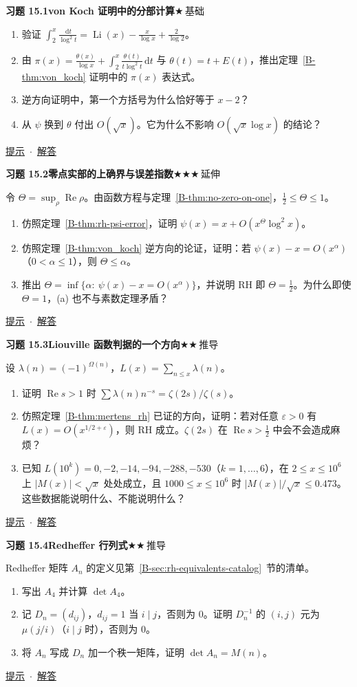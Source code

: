 \documentclass[11pt,a4paper]{article}
\DeclareMathOperator{\Li}{Li}
\newcommand{\dd}{\,\mathrm{d}}
\renewcommand{\Re}{\operatorname{Re}}
\newcommand{\bref}[1]{\ref*{B-#1}}
\newcommand{\lvI}{$\bigstar$\,基础}
\newcommand{\lvII}{$\bigstar\bigstar$\,推导}
\newcommand{\lvIII}{$\bigstar\bigstar\bigstar$\,延伸}
\newcommand{\Q}[3]{%
  \par\addvspace{1.1em}\noindent
  \hypertarget{q:#1}{}\textbf{习题 #1}\quad\textbf{#3}\hfill{\small #2}\par
  \nopagebreak\smallskip}
\newcommand{\toHint}[1]{\hfill{\small\hyperlink{h:#1}{提示}\ $\cdot$\ \hyperlink{s:#1}{解答}}}
\begin{document}
\Q{15.1}{\lvI}{von Koch 证明中的分部计算}
\begin{enumerate}
  \item 验证 $\int_2^x\frac{\dd t}{\log^2t}=\Li(x)-\frac x{\log x}+\frac2{\log2}$。
  \item 由 $\pi(x)=\frac{\theta(x)}{\log x}+\int_2^x\frac{\theta(t)}{t\log^2t}\dd t$ 与 $\theta(t)=t+E(t)$，推出定理~\bref{thm:von_koch} 证明中的 $\pi(x)$ 表达式。
  \item 逆方向证明中，第一个方括号为什么恰好等于 $x-2$？
  \item 从 $\psi$ 换到 $\theta$ 付出 $O(\sqrt x)$。它为什么不影响 $O(\sqrt x\log x)$ 的结论？
\end{enumerate}
\toHint{15.1}

\Q{15.2}{\lvIII}{零点实部的上确界与误差指数}
令 $\Theta=\sup_\rho\Re\rho$。由函数方程与定理~\bref{thm:no-zero-on-one}，$\frac12\le\Theta\le1$。
\begin{enumerate}
  \item 仿照定理~\bref{thm:rh-psi-error}，证明 $\psi(x)=x+O(x^\Theta\log^2x)$。
  \item 仿照定理~\bref{thm:von_koch} 逆方向的论证，证明：若 $\psi(x)-x=O(x^\alpha)$（$0<\alpha\le1$），则 $\Theta\le\alpha$。
  \item 推出 $\Theta=\inf\{\alpha:\ \psi(x)-x=O(x^\alpha)\}$，并说明 RH 即 $\Theta=\frac12$。为什么即使 $\Theta=1$，(a) 也不与素数定理矛盾？
\end{enumerate}
\toHint{15.2}

\Q{15.3}{\lvII}{Liouville 函数判据的一个方向}
设 $\lambda(n)=(-1)^{\Omega(n)}$，$L(x)=\sum_{n\le x}\lambda(n)$。
\begin{enumerate}
  \item 证明 $\Re s>1$ 时 $\sum\lambda(n)n^{-s}=\zeta(2s)/\zeta(s)$。
  \item 仿照定理~\bref{thm:mertens_rh} 已证的方向，证明：若对任意 $\varepsilon>0$ 有 $L(x)=O(x^{1/2+\varepsilon})$，则 RH 成立。$\zeta(2s)$ 在 $\Re s>\frac12$ 中会不会造成麻烦？
  \item 已知 $L(10^k)=0,-2,-14,-94,-288,-530$（$k=1,\dots,6$），在 $2\le x\le10^6$ 上 $|M(x)|<\sqrt x$ 处处成立，且 $1000\le x\le10^6$ 时 $|M(x)|/\sqrt x\le0.473$。这些数据能说明什么、不能说明什么？
\end{enumerate}
\toHint{15.3}

\Q{15.4}{\lvII}{Redheffer 行列式}
Redheffer 矩阵 $A_n$ 的定义见第~\bref{sec:rh-equivalents-catalog}~节的清单。
\begin{enumerate}
  \item 写出 $A_4$ 并计算 $\det A_4$。
  \item 记 $D_n=(d_{ij})$，$d_{ij}=1$ 当 $i\mid j$，否则为 $0$。证明 $D_n^{-1}$ 的 $(i,j)$ 元为 $\mu(j/i)$（$i\mid j$ 时），否则为 $0$。
  \item 将 $A_n$ 写成 $D_n$ 加一个秩一矩阵，证明 $\det A_n=M(n)$。
\end{enumerate}
\toHint{15.4}
\end{document}
